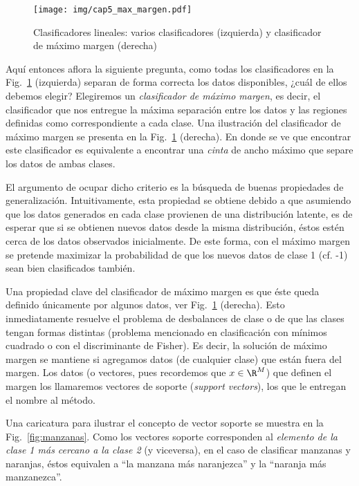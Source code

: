 \begin{figure}[ht]
    \centering
    \texttt{[image: img/cap5\_max\_margen.pdf]}
    \caption{Clasificadores lineales: varios clasificadores (izquierda) y clasificador de máximo margen (derecha)}
    \label{fig:maxim_marg} 
\end{figure}

Aquí entonces aflora la siguiente pregunta, como todas los clasificadores en la Fig.~\ref{fig:maxim_marg} (izquierda) separan de forma correcta los datos disponibles, ¿cuál de ellos debemos elegir? Elegiremos un \emph{clasificador de máximo margen}, es decir, el clasificador que nos entregue la máxima separación entre los datos y las regiones definidas como correspondiente a cada clase. Una ilustración del clasificador de máximo margen se presenta en la Fig.~\ref{fig:maxim_marg} (derecha). En donde se ve que encontrar este clasificador es equivalente a encontrar una \emph{cinta} de ancho máximo que separe los datos de ambas clases.


El argumento de ocupar dicho criterio es la búsqueda de buenas propiedades de generalización. Intuitivamente, esta propiedad se obtiene debido a que asumiendo que los datos generados en cada clase  provienen de una distribución latente, es de esperar que si se obtienen nuevos datos desde la misma distribución, éstos estén cerca de los datos observados inicialmente. De este forma, con el máximo margen se pretende maximizar la probabilidad de que los nuevos datos de clase 1 (cf. -1) sean bien clasificados también.

Una propiedad clave del clasificador de máximo margen es que éste queda definido únicamente por algunos datos, ver Fig.~\ref{fig:maxim_marg} (derecha). Esto inmediatamente resuelve el problema de desbalances de clase o de que las clases tengan formas distintas (problema mencionado en clasificación con mínimos cuadrado o con el discriminante de Fisher). Es decir, la solución de máximo margen se mantiene si agregamos datos (de cualquier clase) que están fuera del margen. Los datos (o vectores, pues recordemos que $x\in\R^M$) que definen el margen los llamaremos vectores de soporte (\emph{support vectors}), los que le entregan el nombre al método. 

Una caricatura para ilustrar el concepto de vector soporte se muestra en la Fig.~\ref{fig:manzanas}. Como los vectores soporte corresponden al \emph{elemento de la clase 1 más cercano a la clase 2} (y viceversa), en el caso de clasificar manzanas y naranjas, éstos equivalen a ``la manzana más naranjezca'' y la ``naranja más manzanezca''. 

